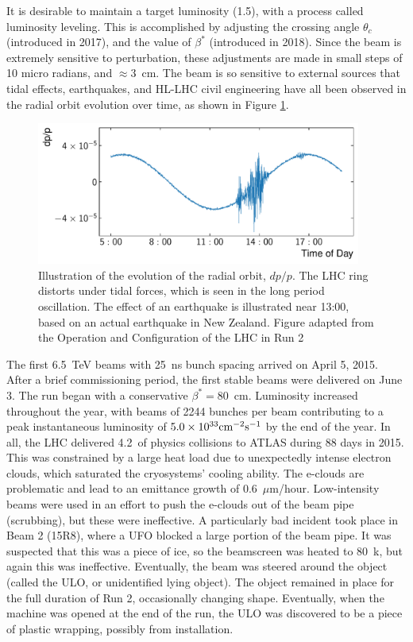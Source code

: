 It is desirable to maintain a target luminosity (1.5\cms), with a process called luminosity leveling.
This is accomplished by adjusting the crossing angle $\theta_c$ (introduced in 2017), and the value of $\beta^*$ (introduced in 2018).
Since the beam is extremely sensitive to perturbation, these adjustments are made in small steps of 10 micro radians, and $\approx3$~cm.
The beam is so sensitive to external sources that tidal effects, earthquakes, and HL-LHC civil engineering have all been observed in the radial orbit evolution over time, as shown in Figure \ref{fig:tides}.

\begin{figure}[h!]
\captionsetup[subfigure]{position=b}
\centering
\includegraphics[width=0.95\textwidth]{figures/experiment/lhc/tides2.pdf}
\caption{Illustration of the evolution of the radial orbit, $dp/p$. The LHC ring distorts under tidal forces, which is seen in the long period oscillation. The effect of an earthquake is illustrated near 13:00, based on an actual earthquake in New Zealand. Figure adapted from the Operation and Configuration of the LHC in Run 2 \cite{lhcRun2}}
\label{fig:tides}
\end{figure}

The first 6.5~TeV beams with 25~ns bunch spacing arrived on April 5, 2015.
After a brief commissioning period, the first stable beams were delivered on June 3.
The run began with a conservative $\beta^*=80$~cm.
Luminosity increased throughout the year, with beams of 2244 bunches per beam contributing to a peak instantaneous luminosity of $5.0\times10^{33}\text{cm}^{-2}\text{s}^{-1}$ by the end of the year.
In all, the LHC delivered 4.2~\fb of physics collisions to ATLAS during 88 days in 2015.
This was constrained by a large heat load due to unexpectedly intense electron clouds, which saturated the cryosystems' cooling ability.
The e-clouds are problematic and lead to an emittance growth of 0.6~$\mu$m/hour.
Low-intensity beams were used in an effort to push the e-clouds out of the beam pipe (scrubbing), but these were ineffective.
A particularly bad incident took place in Beam 2 (15R8), where a UFO blocked a large portion of the beam pipe.
It was suspected that this was a piece of ice, so the beamscreen was heated to 80~k, but again this was ineffective.
Eventually, the beam was steered around the object (called the ULO, or unidentified lying object).
The object remained in place for the full duration of Run 2, occasionally changing shape.
Eventually, when the machine was opened at the end of the run, the ULO was discovered to be a piece of plastic wrapping, possibly from installation.

